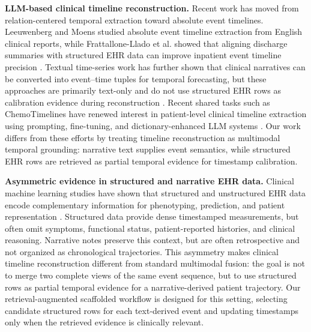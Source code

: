 \documentclass{ws-procs11x85}
\begin{document}
\vspace{5pt}
\noindent
\textbf{LLM-based clinical timeline reconstruction.}
Recent work has moved from relation-centered temporal extraction toward absolute event timelines. Leeuwenberg and Moens studied absolute event timeline extraction from English clinical reports, while Frattallone-Llado et al. showed that aligning discharge summaries with structured EHR data can improve inpatient event timeline precision \cite{leeuwenberg2020towards,frattallone2024using}. Textual time-series work has further shown that clinical narratives can be converted into event--time tuples for temporal forecasting, but these approaches are primarily text-only and do not use structured EHR rows as calibration evidence during reconstruction \cite{wang2025large,noroozizadeh2026reconstructing,noroozizadeh2026forecasting, kumar2026temporally}. Recent shared tasks such as ChemoTimelines have renewed interest in patient-level clinical timeline extraction using prompting, fine-tuning, and dictionary-enhanced LLM systems \cite{yao2025chemotimelines,zhang2025uwbionlp}. Our work differs from these efforts by treating timeline reconstruction as multimodal temporal grounding: narrative text supplies event semantics, while structured EHR rows are retrieved as partial temporal evidence for timestamp calibration.

\vspace{5pt}
\noindent
\textbf{Asymmetric evidence in structured and narrative EHR data.}
Clinical machine learning studies have shown that structured and unstructured EHR data encode complementary information for phenotyping, prediction, and patient representation \cite{moldwin2021empirical,liu2022multimodal,seinen2025using}. Structured data provide dense timestamped measurements, but often omit symptoms, functional status, patient-reported histories, and clinical reasoning. Narrative notes preserve this context, but are often retrospective and not organized as chronological trajectories. This asymmetry makes clinical timeline reconstruction different from standard multimodal fusion: the goal is not to merge two complete views of the same event sequence, but to use structured rows as partial temporal evidence for a narrative-derived patient trajectory. Our retrieval-augmented scaffolded workflow is designed for this setting, selecting candidate structured rows for each text-derived event and updating timestamps only when the retrieved evidence is clinically relevant.

\vspace{-0.75em}
\end{document}
